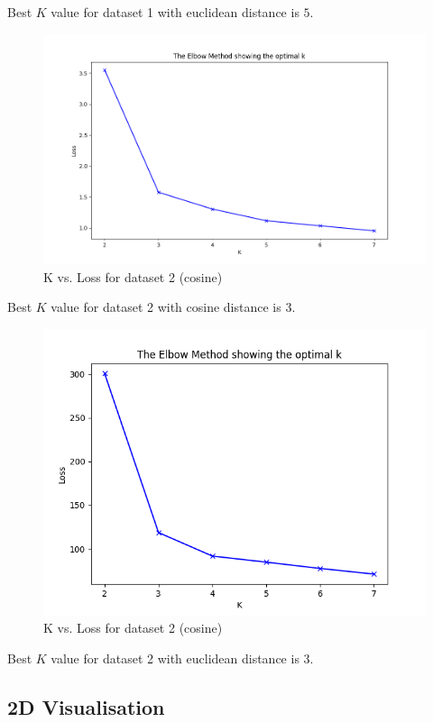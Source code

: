 \documentclass[12pt,a4paper, margin=1in]{article}
\begin{document}
Best $K$ value for dataset 1 with euclidean distance is $5$.

\begin{figure}[H]
    \centering
    \includegraphics[scale=0.75]{elbow_kmedoids_dataset2_cosine.png}
    \caption{K vs. Loss for dataset 2 (cosine)}
\end{figure}

Best $K$ value for dataset 2 with cosine distance is $3$.

\begin{figure}[H]
    \centering
    \includegraphics[scale=0.85]{elbow_kmedoids_dataset2_minkowski.png}
    \caption{K vs. Loss for dataset 2 (cosine)}
\end{figure}

Best $K$ value for dataset 2 with euclidean distance is $3$.

\subsection{2D Visualisation}
\end{document}
